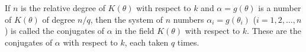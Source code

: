 If $n$ is the relative degree of $K(\theta)$ with respect to $k$ and $\alpha = g(\theta)$ is a number of $K(\theta)$ of degree $n/q$, then the system of $n$ numbers $\alpha_i = g(\theta_i)$ ($i = 1, 2, \ldots, n$) is called the conjugates of $\alpha$ in the field $K(\theta)$ with respect to $k$. These are the conjugates of $\alpha$ with respect to $k$, each taken $q$ times.
